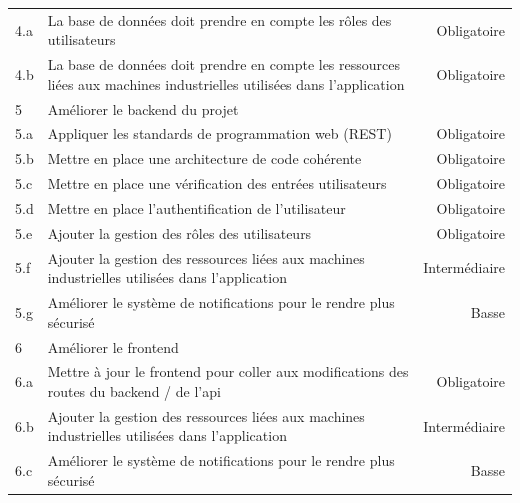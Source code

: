 \documentclass[
    iai, %
    il, %
]{heig-tb}
\begin{document}
\begin{table}[h]
\begin{center}
\begin{tabularx}{1.0\textwidth} {l|X|r}
            4.a & La base de données doit prendre en compte les rôles des utilisateurs                                                   & Obligatoire   \\
            4.b & La base de données doit prendre en compte les ressources liées aux machines industrielles utilisées dans l'application & Obligatoire   \\
            5   & Améliorer le backend du projet                                                                                         &               \\
            5.a & Appliquer les standards de programmation web (REST)                                                                    & Obligatoire   \\
            5.b & Mettre en place une architecture de code cohérente                                                                     & Obligatoire   \\
            5.c & Mettre en place une vérification des entrées utilisateurs                                                              & Obligatoire   \\
            5.d & Mettre en place l'authentification de l'utilisateur                                                                    & Obligatoire   \\
            5.e & Ajouter la gestion des rôles des utilisateurs                                                                          & Obligatoire   \\
            5.f & Ajouter la gestion des ressources liées aux machines industrielles utilisées dans l'application                        & Intermédiaire \\
            5.g & Améliorer le système de notifications pour le rendre plus sécurisé                                                     & Basse         \\
            6   & Améliorer le frontend                                                                                                  &               \\
            6.a & Mettre à jour le frontend pour coller aux modifications des routes du backend / de l'api                               & Obligatoire   \\
            6.b & Ajouter la gestion des ressources liées aux machines industrielles utilisées dans l'application                        & Intermédiaire \\
            6.c & Améliorer le système de notifications pour le rendre plus sécurisé                                                     & Basse         \\

\end{tabularx}
\end{center}
\end{table}
\end{document}
